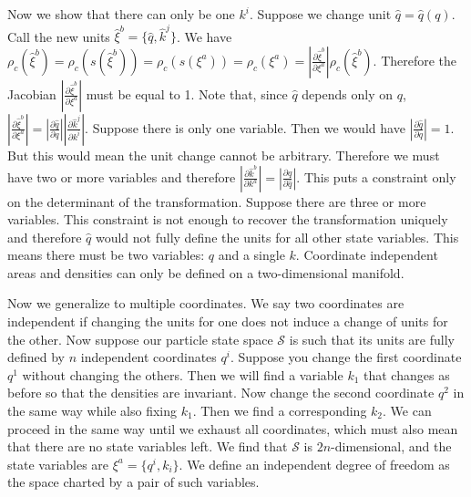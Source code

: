 \documentclass[11pt,letterpaper,fleqn]{memoir} %
\begin{document}
Now we show that there can only be one $k^i$. Suppose we change unit $\hat{q}=\hat{q}(q)$. Call the new units $\hat{\xi}^b = \{ \hat{q}, \hat{k}^j\}$. We have $\rho_c(\hat{\xi}^b)=\rho_c(s(\hat{\xi}^b))=\rho_c(s(\xi^a))=\rho_c(\xi^a) = \left|\frac{\partial \hat{\xi}^b}{\partial \xi^a} \right| \rho_c(\hat\xi^b)$. Therefore the Jacobian $\left|\frac{\partial \hat{\xi}^b}{\partial \xi^a} \right|$ must be equal to 1. Note that, since $\hat{q}$ depends only on $q$, $\left|\frac{\partial \hat{\xi}^b}{\partial \xi^a} \right| = \left|\frac{\partial \hat q}{\partial q} \right|\left|\frac{\partial \hat{k}^j}{\partial k^i} \right|$. Suppose there is only one variable. Then we would have $\left|\frac{\partial \hat q}{\partial q} \right| = 1$. But this would mean the unit change cannot be arbitrary. Therefore we must have two or more variables and therefore $\left|\frac{\partial \hat{k}^b}{\partial k^a} \right| = \left|\frac{\partial q}{\partial \hat q} \right|$. This puts a constraint only on the determinant of the transformation. Suppose there are three or more variables. This constraint is not enough to recover the transformation uniquely and therefore $\hat q$  would not fully define the units for all other state variables. This means there must be two variables: $q$ and a single $k$. Coordinate independent areas and densities can only be defined on a two-dimensional manifold.

Now we generalize to multiple coordinates. We say two coordinates are independent if changing the units for one does not induce a change of units for the other. Now suppose our particle state space $\mathcal{S}$ is such that its units are fully defined by $n$ independent coordinates $q^i$. Suppose you change the first coordinate $q^1$ without changing the others. Then we will find a variable $k_1$ that changes as before so that the densities are invariant. Now change the second coordinate $q^2$ in the same way while also fixing $k_1$. Then we find a corresponding $k_2$. We can proceed in the same way until we exhaust all coordinates, which must also mean that there are no state variables left. We find that $\mathcal{S}$ is $2n$-dimensional, and the state variables are $\xi^a = \{ q^i, k_i \}$. We define an independent degree of freedom as the space charted by a pair of such variables.
\end{document}
